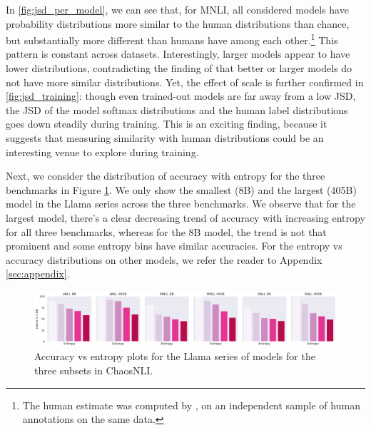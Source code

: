 In \cref{fig:jsd_per_model}, we can see that, for MNLI, all considered models have probability distributions more similar to the human distributions than chance, but substantially more different than humans have among each other.\footnote{The human estimate was computed by \citet{nie-etal-2020-learn}, on an independent sample of human annotations on the same data.}
This pattern is constant across datasets. 
Interestingly, larger models appear to have lower distributions, contradicting the finding of \citet{nie-etal-2020-learn} that better or larger models do not have more similar distributions.
Yet, the effect of scale is further confirmed in \cref{fig:jsd_training}: though even trained-out models are far away from a low JSD, the JSD of the model softmax distributions and the human label distributions goes down steadily during training.
This is an exciting finding, because it suggests that measuring similarity with human distributions could be an interesting venue to explore during training.

Next, we consider the distribution of accuracy with entropy for the three benchmarks in Figure \ref{fig:entropy_accuracy}. We only show the smallest (8B) and the largest (405B) model in the Llama series across the three benchmarks. We observe that for the largest model, there's a clear decreasing trend of accuracy with increasing entropy for all three benchmarks, whereas for the 8B model, the trend is not that prominent and some entropy bins have similar accuracies. For the entropy vs accuracy distributions on other models, we refer the reader to Appendix \ref{sec:appendix}.

\begin{figure}[t]
    \centering
    \includegraphics[width=0.95\linewidth]{figures/entropy_acc_8_405}
    \caption{Accuracy vs entropy plots for the Llama series of models for the three subsets in ChaosNLI.}
    \label{fig:entropy_accuracy}
\end{figure}
% 

